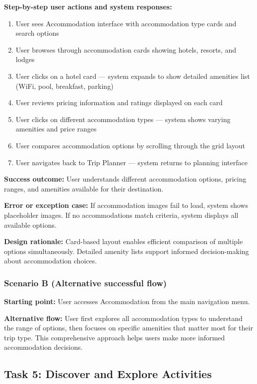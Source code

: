 \documentclass[11pt,a4paper]{article}
\begin{document}
\textbf{Step-by-step user actions and system responses:}
\begin{enumerate}
\item User sees Accommodation interface with accommodation type cards and search options
\item User browses through accommodation cards showing hotels, resorts, and lodges
\item User clicks on a hotel card — system expands to show detailed amenities list (WiFi, pool, breakfast, parking)
\item User reviews pricing information and ratings displayed on each card
\item User clicks on different accommodation types — system shows varying amenities and price ranges
\item User compares accommodation options by scrolling through the grid layout
\item User navigates back to Trip Planner — system returns to planning interface
\end{enumerate}

\textbf{Success outcome:} User understands different accommodation options, pricing ranges, and amenities available for their destination.

\textbf{Error or exception case:} If accommodation images fail to load, system shows placeholder images. If no accommodations match criteria, system displays all available options.

\textbf{Design rationale:} Card-based layout enables efficient comparison of multiple options simultaneously. Detailed amenity lists support informed decision-making about accommodation choices.

\subsubsection*{Scenario B (Alternative successful flow)}

\textbf{Starting point:} User accesses Accommodation from the main navigation menu.

\textbf{Alternative flow:} User first explores all accommodation types to understand the range of options, then focuses on specific amenities that matter most for their trip type. This comprehensive approach helps users make more informed accommodation decisions.

\subsection*{Task 5: Discover and Explore Activities}
\end{document}
